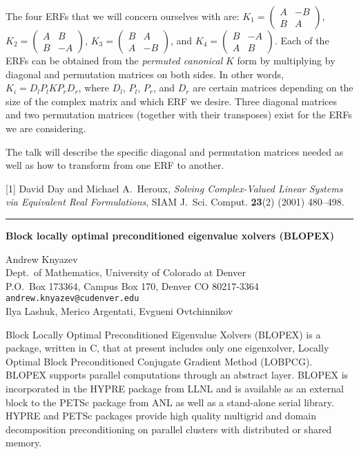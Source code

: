 \documentclass[twosided]{report}
\newcommand{\TwoMatrx}[4]{ \left(
	\begin{array}{cc}
	#1 & #2 \\
	#3 & #4
	\end{array}
	\right) }
\begin{document}
The four ERFs that we will concern
ourselves with are:
$K_1 = \TwoMatrx{A}{-B}{B}{A}$,
$K_2 = \TwoMatrx{A}{B}{B}{-A}$,
$K_3 = \TwoMatrx{B}{A}{A}{-B}$, and
$K_4 = \TwoMatrx{B}{-A}{A}{B}$.
Each of the ERFs can be obtained from the
\emph{permuted canonical} $K$ form by multiplying by
diagonal and permutation matrices on both sides.
In other words,
$K_i = D_l P_l K P_r D_r$,
where $D_l$, $P_l$, $P_r$, and $D_r$ are
certain matrices depending on the size of the complex matrix
and which ERF we desire. Three diagonal matrices and two
permutation matrices (together with their transposes) exist
for the ERFs we are considering.

The talk will describe
the specific diagonal and permutation matrices needed as
well as how to transform from one ERF to another.

[1] David Day and Michael A.~Heroux,
{\em Solving Complex-Valued Linear Systems
via Equivalent Real Formulations},
SIAM J.~Sci. Comput. {\bf 23}(2) (2001) 480--498.



	\begin{center} \rule{6in}{1pt} \end{center}

\begin{center}
{\large			%
{\bf Block locally optimal preconditioned eigenvalue xolvers (BLOPEX)}}

	Andrew Knyazev \\
	Dept.~of Mathematics, University of Colorado at Denver \\
	P.O.~Box 173364, Campus Box 170, Denver CO 80217-3364 \\
	{\tt andrew.knyazev@cudenver.edu} \\
	Ilya Lashuk, Merico Argentati, Evgueni Ovtchinnikov
\end{center}
Block Locally Optimal Preconditioned Eigenvalue Xolvers
(BLOPEX) is a package, written in C, that at present
includes only one eigenxolver, Locally Optimal Block
Preconditioned Conjugate Gradient Method (LOBPCG). BLOPEX
supports parallel computations through an abstract layer.
BLOPEX is incorporated in the HYPRE package from LLNL and is
available as an external block to the PETSc package from ANL
as well as a stand-alone serial library. HYPRE and PETSc
packages provide high quality multigrid and domain
decomposition preconditioning on parallel clusters with
distributed or shared memory.
\end{document}

